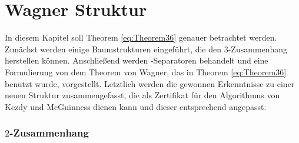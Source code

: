 \chapter{Wagner Struktur}
\label{cha:wagnerstruktur}

In diesem Kapitel soll Theorem \ref{eq:Theorem36} genauer betrachtet werden.
Zunächst werden einige Baumstrukturen eingeführt, die den $3$-Zusammenhang herstellen können.
Anschließend werden \dd-Separatoren behandelt und eine Formulierung von dem Theorem von Wagner, das in Theorem \ref{eq:Theorem36} benutzt wurde, vorgestellt.
Letztlich werden die gewonnen Erkenntnisse zu einer neuen Struktur zusammengefasst, die als Zertifikat für den Algorithmus von Kezdy und McGuinness dienen kann und dieser entsprechend angepasst.

\subsection{$2$-Zusammenhang}


